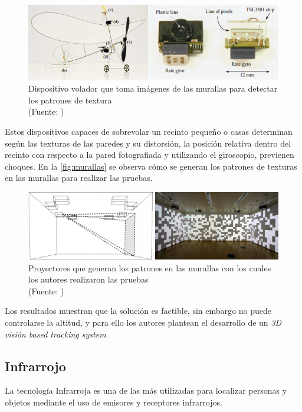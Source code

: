 \begin{figure}[ht!]
\centering
\includegraphics[width=.6\textwidth]{figures/10gr.png}
\caption[Dispositivo volador 10 gramos]{Dispositivo volador que toma imágenes de las murallas para detectar los patrones de textura\\
{\scriptsize (Fuente: \citep{4058367})}}
\label{fig:10gr}
\end{figure}

Estos dispositivos capaces de sobrevolar un recinto pequeño o casas determinan según las texturas de las paredes y su distorsión, la posición relativa dentro del recinto con respecto a la pared fotografiada y utilizando el giroscopio, previenen choques. En la  \autoref{fig:murallas} se observa cómo se generan los patrones de texturas en las murallas para realizar las pruebas.\\

\begin{figure}[ht!]
\centering
\includegraphics[width=.6\textwidth]{figures/Murallas.png}
\caption[Proyección en murallas vision based]{Proyectores que generan los patrones en las murallas con los cuales los autores realizaron las pruebas\\
{\scriptsize (Fuente: \citep{4058367})}}
\label{fig:murallas}
\end{figure}

Los resultados muestran que la solución es factible, sin embargo no puede controlarse la altitud, y para ello los autores plantean el desarrollo de un \textit{3D visión based tracking system}.

\subsection{Infrarrojo}

La tecnología Infrarroja es una de las más utilizadas para localizar personas y objetos mediante el uso de emisores y receptores infrarrojos.

